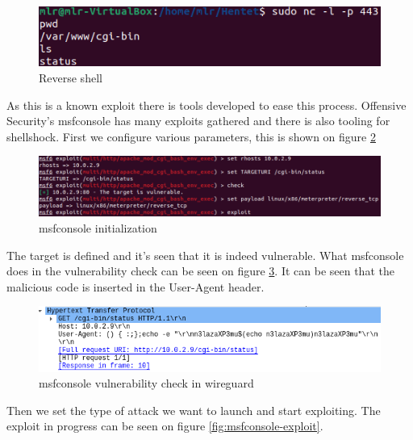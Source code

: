\begin{figure} [ht]
    \centering
    \includegraphics[width=\columnwidth]{../pictures/reverse-shell.png}
    \caption{Reverse shell}
    \label{fig:reverse-shell}
\end{figure}

As this is a known exploit there is tools developed to ease this process. Offensive Security's msfconsole\cite{metasploit} has many exploits gathered and there is also tooling for shellshock. First we configure various parameters, this is shown on figure \ref{fig:msfconsole-init}     

\begin{figure} [ht]
    \centering
    \includegraphics[width=\columnwidth]{../pictures/msfconsole-init.png}
    \caption{msfconsole initialization}
    \label{fig:msfconsole-init}
\end{figure}
The target is defined and it's seen that it is indeed vulnerable. What msfconsole does in the vulnerability check can be seen on figure \ref{fig:msfconsole-check-wireguard}. It can be seen that the malicious code is inserted in the User-Agent header. 

\begin{figure} [ht]
    \centering
    \includegraphics[width=\columnwidth]{../pictures/msfconsole-check-wireguard.png}
    \caption{msfconsole vulnerability check in wireguard}
    \label{fig:msfconsole-check-wireguard}
\end{figure}

Then we set the type of attack we want to launch and start exploiting. The exploit in progress can be seen on figure \ref{fig:msfconsole-exploit}. 

